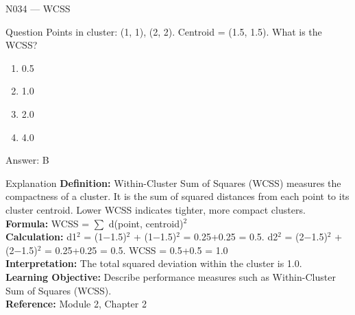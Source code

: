 \documentclass[aspectratio=169,8pt]{beamer}
\begin{document}
	\begin{frame}{N034 --- WCSS}
		\begin{block}{Question}
			Points in cluster: (1, 1), (2, 2). Centroid = (1.5, 1.5). What is the WCSS?
			\begin{enumerate}
				\item 0.5
				\item 1.0
				\item 2.0
				\item 4.0
			\end{enumerate}
		\end{block}
		\begin{exampleblock}{Answer: B}\end{exampleblock}
		\begin{block}{Explanation}
			\textbf{Definition:} Within-Cluster Sum of Squares (WCSS) measures the compactness of a cluster. It is the sum of squared distances from each point to its cluster centroid. Lower WCSS indicates tighter, more compact clusters.\\
			\textbf{Formula:} WCSS = $\sum$ d(point, centroid)$^{2}$\\
			\textbf{Calculation:} d1$^{2}$ = (1$-$1.5)$^{2}$ + (1$-$1.5)$^{2}$ = 0.25+0.25 = 0.5. d2$^{2}$ = (2$-$1.5)$^{2}$ + (2$-$1.5)$^{2}$ = 0.25+0.25 = 0.5. WCSS = 0.5+0.5 = 1.0\\
			\textbf{Interpretation:} The total squared deviation within the cluster is 1.0.\\
			\textbf{Learning Objective:} Describe performance measures such as Within-Cluster Sum of Squares (WCSS).\\
			\textbf{Reference:} Module 2, Chapter 2
		\end{block}
	\end{frame}
	
\end{document}
